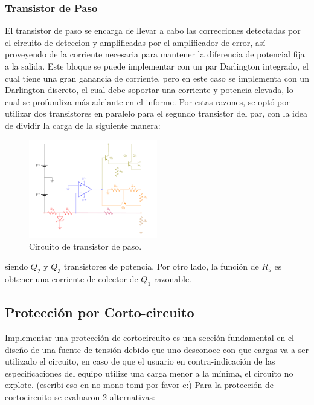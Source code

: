 \subsubsection{Transistor de Paso}
El transistor de paso se encarga de llevar a cabo las correcciones detectadas por el circuito de deteccion y amplificadas por el amplificador de error, así proveyendo de la corriente necesaria para mantener la diferencia de potencial fija a la salida. Este bloque se puede implementar con un par Darlington integrado, el cual tiene una gran ganancia de corriente, pero en este caso se implementa con un Darlington discreto, el cual debe soportar una corriente y potencia elevada, lo cual se profundiza más adelante en el informe. Por estas razones, se optó por utilizar dos transistores en paralelo para el segundo transistor del par, con la idea de dividir la carga de la siguiente manera:
\begin{figure}[H]
\centering
	\includegraphics[width=0.5\textwidth, page=5]{ImagenesEjercicio2/Regulador.pdf}
	\caption{Circuito de transistor de paso.}
	\label{fig:transistorDePaso}
\end{figure}
siendo $Q_2$ y $Q_3$ transistores de potencia. Por otro lado, la función de $R_5$ es obtener una corriente de colector de $Q_1$ razonable.
\subsection{Protección por Corto-circuito}
Implementar una protección de cortocircuito es una sección fundamental en el diseño de una fuente de tensión debido que uno desconoce con que cargas va  a ser utilizado el circuito, en caso de que el usuario en contra-indicación de las especificaciones del equipo utilize una carga menor a la mínima, el circuito no explote. (escribi eso en no mono tomi por favor c:) 
Para la protección de cortocircuito se evaluaron 2 alternativas:
